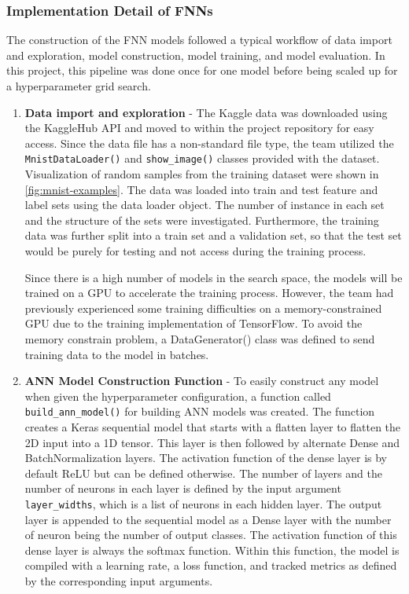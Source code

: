 \documentclass[a4paper]{article}
\begin{document}
\subsubsection{Implementation Detail of FNNs}
The construction of the FNN models followed a typical workflow of data import and exploration, model construction, model training, and model evaluation. In this project, this pipeline was done once for one model before being scaled up for a hyperparameter grid search.

\begin{enumerate}
    \item \textbf{Data import and exploration} - The Kaggle data was downloaded using the KaggleHub API and moved to within the project repository for easy access. Since the data file has a non-standard file type, the team utilized the \lstinline{MnistDataLoader()} and \lstinline{show_image()} classes provided with the dataset. Visualization of random samples from the training dataset were shown in \autoref{fig:mnist-examples}. The data was loaded into train and test feature and label sets using the data loader object. The number of instance in each set and the structure of the sets were investigated. Furthermore, the training data was further split into a train set and a validation set, so that the test set would be purely for testing and not access during the training process.
    
    Since there is a high number of models in the search space, the models will be trained on a GPU to accelerate the training process. However, the team had previously experienced some training difficulties on a memory-constrained GPU due to the training implementation of TensorFlow. To avoid the memory constrain problem, a DataGenerator() class was defined to send training data to the model in batches. 
    \item \textbf{ANN Model Construction Function} - To easily construct any model when given the hyperparameter configuration, a function called \lstinline{build_ann_model()} for building ANN models was created. The function creates a Keras sequential model that starts with a flatten layer to flatten the 2D input into a 1D tensor. This layer is then followed by alternate Dense and BatchNormalization layers. The activation function of the dense layer is by default ReLU but can be defined otherwise. The number of layers and the number of neurons in each layer is defined by the input argument \lstinline{layer_widths}, which is a list of neurons in each hidden layer. The output layer is appended to the sequential model as a Dense layer with the number of neuron being the number of output classes. The activation function of this dense layer is always the softmax function. Within this function, the model is compiled with a learning rate, a loss function, and tracked metrics as defined by the corresponding input arguments.
    

\end{enumerate}
\end{document}
